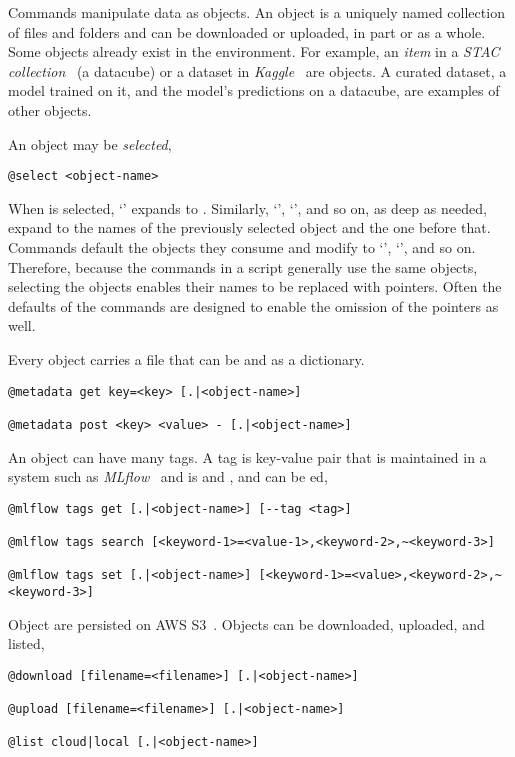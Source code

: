 Commands manipulate data as objects. An object is a uniquely named collection of files and folders and can be downloaded or uploaded, in part or as a whole. Some objects already exist in the environment. For example, an \emph{item} in a \emph{STAC collection}~\cite{stac_intro_tutorial} (a datacube) or a dataset in \emph{Kaggle}~\cite{chen2019-AIRD-dataset} are objects. A curated dataset, a model trained on it, and the model's predictions on a datacube, are examples of other objects.

An object may be \emph{selected},
%
\begin{verbatim}
@select <object-name>
\end{verbatim}
%
When  is selected,  `' expands to . Similarly, `', `', and so on, as deep as needed, expand to the names of the previously selected object and the one before that. Commands default the objects they consume and modify to `', `', and so on. Therefore, because the commands in a script generally use the same objects, selecting the objects enables their names to be replaced with pointers. Often the defaults of the commands are designed to enable the omission of the pointers as well.

Every object carries a  file that can be  and  as a dictionary.
%
\begin{verbatim}
@metadata get key=<key> [.|<object-name>]

@metadata post <key> <value> - [.|<object-name>]
\end{verbatim}

An object can have many tags. A tag is key-value pair that is maintained in a system such as \emph{MLflow}~\cite{mlflow} and is  and , and can be ed,
%
\begin{verbatim}
@mlflow tags get [.|<object-name>] [--tag <tag>]

@mlflow tags search [<keyword-1>=<value-1>,<keyword-2>,~<keyword-3>]

@mlflow tags set [.|<object-name>] [<keyword-1>=<value>,<keyword-2>,~<keyword-3>]
\end{verbatim}

Object are persisted on AWS S3~\cite{aws_s3}. Objects can be downloaded, uploaded, and listed,
%
\begin{verbatim}
@download [filename=<filename>] [.|<object-name>]

@upload [filename=<filename>] [.|<object-name>]
    
@list cloud|local [.|<object-name>]
\end{verbatim}